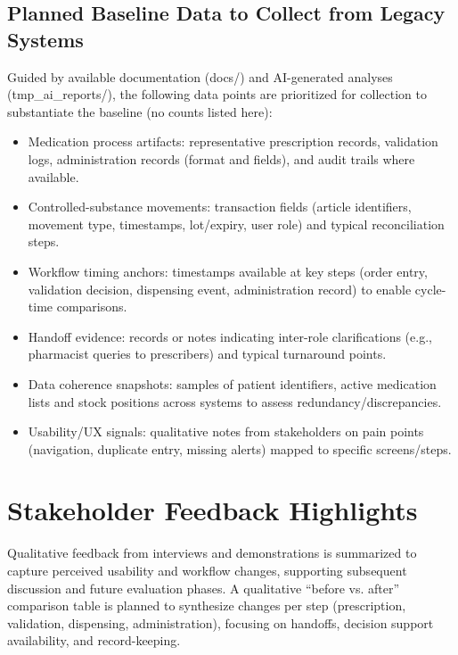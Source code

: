 \subsection{Planned Baseline Data to Collect from Legacy Systems}
Guided by available documentation (docs/) and AI-generated analyses (tmp\_ai\_reports/), the following data points are prioritized for collection to substantiate the baseline (no counts listed here):
\begin{itemize}
    \item Medication process artifacts: representative prescription records, validation logs, administration records (format and fields), and audit trails where available.
    \item Controlled-substance movements: transaction fields (article identifiers, movement type, timestamps, lot/expiry, user role) and typical reconciliation steps.
    \item Workflow timing anchors: timestamps available at key steps (order entry, validation decision, dispensing event, administration record) to enable cycle-time comparisons.
    \item Handoff evidence: records or notes indicating inter-role clarifications (e.g., pharmacist queries to prescribers) and typical turnaround points.
    \item Data coherence snapshots: samples of patient identifiers, active medication lists and stock positions across systems to assess redundancy/discrepancies.
    \item Usability/UX signals: qualitative notes from stakeholders on pain points (navigation, duplicate entry, missing alerts) mapped to specific screens/steps.
\end{itemize}

\section{Stakeholder Feedback Highlights}
Qualitative feedback from interviews and demonstrations is summarized to capture perceived usability and workflow changes, supporting subsequent discussion and future evaluation phases. A qualitative “before vs. after” comparison table is planned to synthesize changes per step (prescription, validation, dispensing, administration), focusing on handoffs, decision support availability, and record-keeping.

